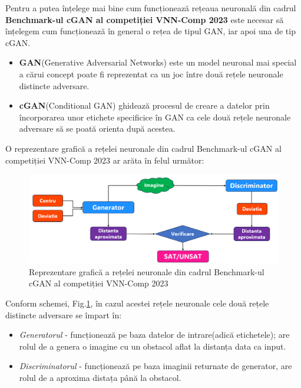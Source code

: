 \hspace{0.5 cm}
Pentru a putea înțelege mai bine cum funcționează rețeaua neuronală din cadrul \textbf{Benchmark-ul cGAN al competiției VNN-Comp 2023} este necesar să înțelegem cum funcționează în general o rețea de tipul GAN, iar apoi una de tip cGAN.
\begin{itemize}
    \item \textbf{GAN}(Generative Adversarial Networks) este un model neuronal mai special \cite{GAN} a cărui concept poate fi reprezentat ca un joc între două rețele neuronale distincte adversare.

    \item \textbf{cGAN}(Conditional GAN) \cite{CGAN} ghidează procesul de creare a datelor prin încorporarea unor etichete specificice în GAN ca cele două rețele neuronale adversare să se poată orienta după acestea.
\newline
\end{itemize}

O reprezentare grafică a rețelei neuronale din cadrul Benchmark-ul cGAN al competiției VNN-Comp 2023 ar arăta în felul următor:


\begin{figure}[ht]
\centering
\includegraphics[width=12cm]{imagini/introducere/Ale_1.png}
\caption{Reprezentare grafică a rețelei neuronale din cadrul Benchmark-ul cGAN al competiției VNN-Comp 2023}
\label{reprezentare_grafica_cGAN}
\end{figure}

Conform schemei, Fig.\ref{reprezentare_grafica_cGAN}, în cazul acestei rețele neuronale cele două rețele distincte adversare se împart în:

\begin{itemize}
  \item \textit{Generatorul} - funcționează pe baza datelor de intrare(adică etichetele); are rolul de a genera o imagine cu un obstacol aflat la distanța data ca input.
  
  \item \textit{Discriminatorul} - funcționează pe baza imaginii returnate de generator, are rolul de a aproxima distața până la obstacol.
\end{itemize}
\newpage

